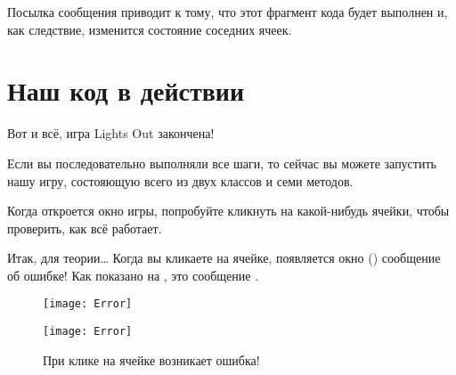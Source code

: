 \documentclass[a4paper,10pt,twoside]{book}
\begin{document}

\noindent
Посылка сообщения  приводит к тому, что этот фрагмент кода будет выполнен и, как следствие, изменится состояние соседних ячеек.

\section{Наш код в действии}

Вот и всё, игра Lights Out закончена!

Если вы последовательно выполняли все шаги, то сейчас вы можете запустить нашу игру, состояющую всего из двух классов и семи методов.


Когда откроется окно игры, попробуйте кликнуть на какой-нибудь ячейки, чтобы проверить, как всё работает.

Итак, для теории\ldots{}
Когда вы кликаете на ячейке, появляется окно  () сообщение об ошибке!
Как показано на , это сообщение .

\begin{figure}[ht]
\ifluluelse
	{\centerline{\texttt{[image: Error]}}}
	{\centerline{\texttt{[image: Error]}}}
\caption{При клике на ячейке возникает ошибка!
}
\end{figure}
\end{document}

